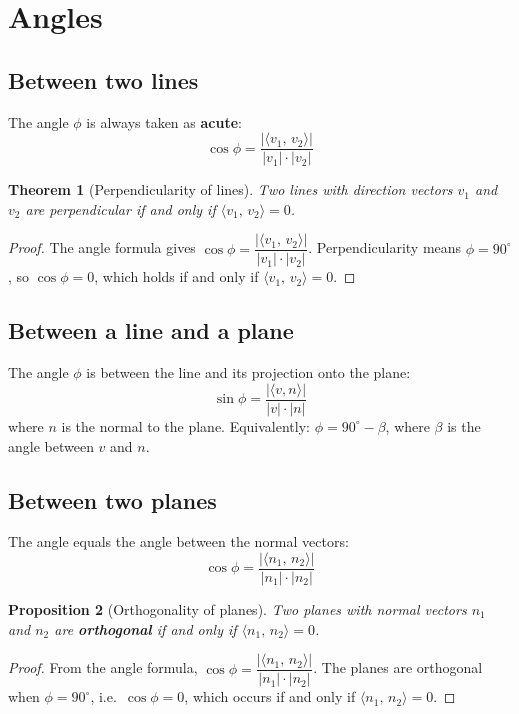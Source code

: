 \documentclass[11pt]{article}
\theoremstyle{plain}
\newtheorem{theorem}{Theorem}[section]
\newtheorem{proposition}[theorem]{Proposition}
\theoremstyle{definition}
\newcommand{\ip}[2]{\langle #1,\, #2 \rangle}
\begin{document}
\newpage

\section{Angles}

\subsection{Between two lines}

The angle $\phi$ is always taken as \textbf{acute}:
\[
\cos \phi = \frac{|\ip{v_1}{v_2}|}{|v_1| \cdot |v_2|}
\]

\begin{theorem}[Perpendicularity of lines]
Two lines with direction vectors $v_1$ and $v_2$ are perpendicular if and only if\/ $\ip{v_1}{v_2} = 0$.
\end{theorem}

\begin{proof}
The angle formula gives $\cos\phi = \dfrac{|\ip{v_1}{v_2}|}{|v_1|\cdot|v_2|}$.
Perpendicularity means $\phi = 90^\circ$, so $\cos\phi = 0$, which holds if and only if $\ip{v_1}{v_2} = 0$.
\end{proof}

\subsection{Between a line and a plane}

The angle $\phi$ is between the line and its projection onto the plane:
\[
\sin \phi = \frac{|\langle v, n \rangle|}{|v| \cdot |n|}
\]
where $n$ is the normal to the plane. Equivalently: $\phi = 90^\circ - \beta$, where $\beta$ is the angle between $v$ and $n$.

\subsection{Between two planes}

The angle equals the angle between the normal vectors:
\[
\cos \phi = \frac{|\ip{n_1}{n_2}|}{|n_1| \cdot |n_2|}
\]

\begin{proposition}[Orthogonality of planes]
Two planes with normal vectors $n_1$ and $n_2$ are \textbf{orthogonal} if and only if\/ $\ip{n_1}{n_2} = 0$.
\end{proposition}

\begin{proof}
From the angle formula, $\cos\phi = \dfrac{|\ip{n_1}{n_2}|}{|n_1|\cdot|n_2|}$.
The planes are orthogonal when $\phi = 90^\circ$, i.e.\ $\cos\phi = 0$, which occurs if and only if $\ip{n_1}{n_2} = 0$.
\end{proof}
\end{document}
